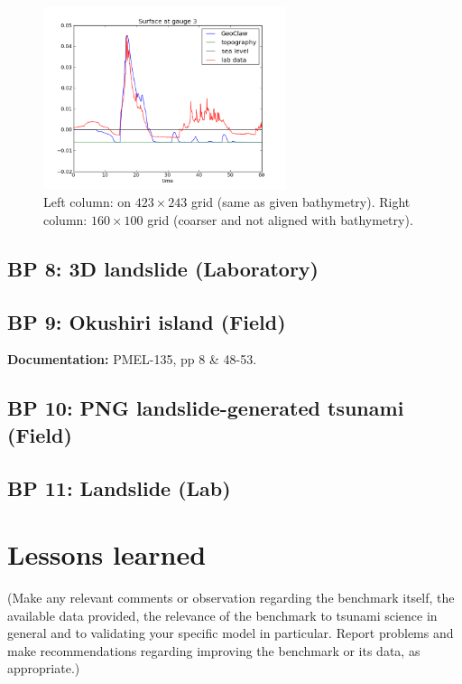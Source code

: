 \documentclass[11pt]{article}
\begin{document}
\begin{figure}[ht]
\hfil\includegraphics[width=2.8in]{bp7/figs160/gauge0003fig300.png}\hfil
\caption{\label{fig:bp7gauges} 
Left column: on $423\times 243$ grid (same as given bathymetry).
Right column: $160\times 100$ grid (coarser and not aligned with
bathymetry).
  }
\end{figure}


\clearpage
\newpage
\subsection{BP 8:
 3D landslide (Laboratory)}

\subsection{BP 9:
 Okushiri island (Field)}

{\bf Documentation:}  PMEL-135, pp 8 \& 48-53.

\subsection{BP 10:
 PNG landslide-generated tsunami (Field)}

\subsection{BP 11:
 Landslide (Lab)}

\section{Lessons learned}

(Make any relevant comments or observation regarding the benchmark itself,
the available data provided, the relevance of the benchmark to tsunami
science in general and to validating your specific model in particular. 
Report problems and make recommendations regarding improving the benchmark
or its data, as appropriate.)





\end{document}
